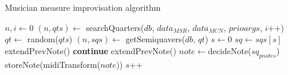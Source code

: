 \begin{algorithm}[H]
\caption{Musician measure improvisation algorithm}
\label{algo-musician-measure}
\begin{algorithmic}[1]
	 
		\State $n,i\gets0$
			\State $(n,qts)\gets$ searchQuarters($db$, $data_{MSR}$, $data_{MCN}$, $prioargs$, $i$++)
		\EndWhile
		\State $qt\gets$ random($qts$)
		\State $(n,sqs)\gets$ getSemiquavers($db$, $qt$)
		\State $s\gets0$
		 
			\State $sq\gets sqs[s]$
				\State extendPrevNote()
				\State \textbf{continue}
			\EndIf
				\State extendPrevNote()
			\Else
				\State $note \gets$decideNote($sq_{pnotes}$)
				\State storeNote(midiTransform($note$))
			\EndIf
			\State $s$++
			
		\EndFor
	\EndFor
\EndFunction
\end{algorithmic}
\end{algorithm}

